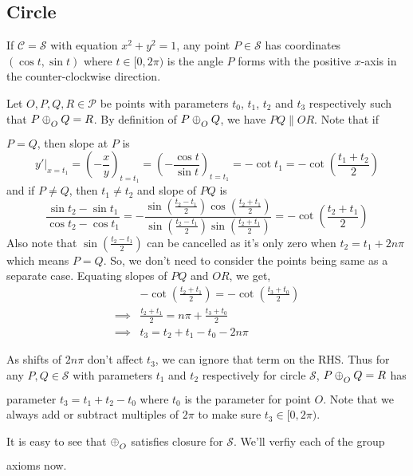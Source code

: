 \subsection*{Circle}

If $\mathcal{C}=\mathcal{S}$ with equation $x^2+y^2=1$, any point
$P\in\mathcal{S}$ has coordinates $(\cos t,\sin t)$ where $t\in[0,2\pi)$ is the
angle $P$ forms with the positive $x$-axis in the counter-clockwise direction.
\vspace{1ex}

Let $O,P,Q,R\in\mathcal{P}$ be points with parameters $t_0$, $t_1$, $t_2$ and
$t_3$ respectively such that $P \conop Q = R$. By definition of $P \conop Q$, we
have $PQ \parallel OR$. Note that if $P=Q$, then slope at $P$ is
\[
    y'|_{x=t_1} = \left(-\frac{x}{y}\right)_{t=t_1}
    = \left(-\frac{\cos t}{\sin t}\right)_{t=t_1}
                = -\cot t_1
                = -\cot \left(\frac{t_1+t_2}{2}\right)
\]
and if $P \neq Q$, then $t_1 \neq t_2$ and slope of $PQ$ is 
\[
    \frac{\sin t_2 - \sin t_1}{\cos t_2 - \cos t_1}
    = -\frac{\sin\left(\frac{t_2-t_1}{2}\right)\cos\left(\frac{t_2+t_1}{2}\right)}{\sin\left(\frac{t_2-t_1}{2}\right)\sin\left(\frac{t_2+t_1}{2}\right)}
    = -\cot\left(\frac{t_2+t_1}{2}\right)
\]
Also note that $\sin\left(\frac{t_2 - t_1}{2}\right)$ can be cancelled as it's
only zero when $t_2=t_1+2n\pi$ which means $P=Q$. So, we don't need to consider
the points being same as a separate case. Equating slopes of $PQ$ and $OR$, we
get,
\begin{align*}
    &-\cot\left(\frac{t_2+t_1}{2}\right) = -\cot\left(\frac{t_3+t_0}{2}\right) \\
    \implies& \frac{t_2+t_1}{2} = n\pi+\frac{t_3+t_0}{2} \\
    \implies& t_3 = t_2 + t_1 - t_0 - 2n\pi
\end{align*}

\noindent
As shifts of $2n\pi$ don't affect $t_3$, we can ignore that term on the RHS.
Thus for any $P,Q\in\mathcal{S}$ with parameters $t_1$ and $t_2$
respectively for circle $\mathcal{S}$, $P \conop Q = R$ has parameter
$t_3 = t_1 + t_2 - t_0$ where $t_0$ is the parameter for point
$O$. Note that we always add or subtract multiples of $2\pi$ to make sure
$t_3\in[0,2\pi)$.
\vspace{1ex}

It is easy to see that $\conop$ satisfies closure for $\mathcal{S}$. We'll verfiy each of 
the group axioms now.

